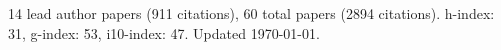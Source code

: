 14 lead author papers (911 citations),
60 total papers (2894 citations).\newline
h-index: 31, g-index: 53, i10-index: 47. Updated \today.